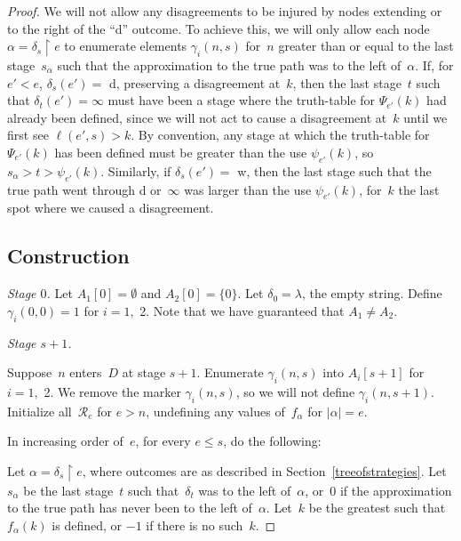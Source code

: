 \documentclass{LMCS}
\def\res{\!\!\upharpoonright\!}     \def\eres{\!\upharpoonright\!}     \def\nes{n_{e,s}}
\newcommand{\0}{\mathbf{0}}
\newcommand{\<}{\langle}
\renewcommand{\>}{\rangle}
\begin{document}
\begin{proof}
We will not allow any disagreements to be injured by nodes extending or to
the right of the ``d'' outcome.  To achieve this, we will only allow each
node $\alpha=\delta_s\res e$ to enumerate elements $\gamma_i(n,s)$ for~$n$
greater than or equal to the last stage~$s_\alpha$ such that the
approximation to the true path was to the left of~$\alpha$.  If, for $e'<e$,
$\delta_s(e')=$ d, preserving a disagreement at~$k$, then the last stage~$t$
such that $\delta_t(e')=\infty$ must have been a stage where the truth-table
for $\Psi_{e'}(k)$ had already been defined, since we will not act to cause a
disagreement at~$k$ until we first see $\ell(e',s)>k$.  By convention, any
stage at which the truth-table for $\Psi_{e'}(k)$ has been defined must be
greater than the use $\psi_{e'}(k)$, so $s_\alpha>t>\psi_{e'}(k)$. Similarly,
if $\delta_s(e')=$ w, then the last stage such that the true path went
through d or~$\infty$ was larger than the use $\psi_{e'}(k)$, for~$k$ the
last spot where we caused a disagreement.



\subsection{Construction}\label{minpairconst}

{\em Stage $0$.}  Let $A_1[0]=\emptyset$ and $A_2[0]=\{0\}$.  Let
$\delta_0=\lambda$, the empty string.  Define $\gamma_i(0,0)=1$ for $i=1,$ 2.
Note that we have guaranteed that $A_1\neq A_2$.

{\em Stage $s+1$.}

Suppose~$n$ enters~$D$ at stage $s+1$.  Enumerate $\gamma_i(n,s)$ into
$A_i[s+1]$ for $i=1,$ 2.  We remove the marker $\gamma_i(n,s)$, so we will
not define $\gamma_i(n,s+1)$.  Initialize all~$\mathcal R_e$ for $e>n$,
undefining any values of~$f_\alpha$ for $|\alpha|=e$.

In increasing order of~$e$, for every $e\leq s$, do the following:

Let $\alpha=\delta_s\res e$, where outcomes are as described in
Section~\ref{treeofstrategies}.  Let $s_\alpha$ be the last stage~$t$ such
that~$\delta_t$ was to the left of~$\alpha$, or~0 if the approximation to the
true path has never been to the left of~$\alpha$.  Let~$k$ be the greatest
such that $f_{\alpha}(k)$ is defined, or ${-1}$ if there is no such~$k$.


\end{proof}
\end{document}
